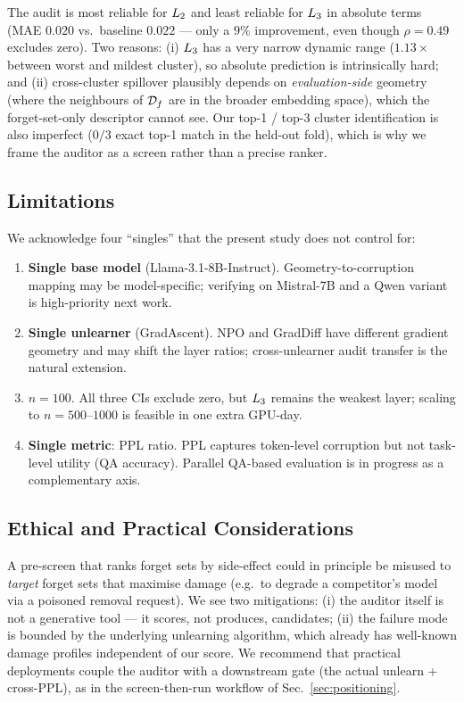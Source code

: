 The audit is most reliable for $L_2$ and least reliable for $L_3$ in absolute terms (MAE $0.020$ vs.\ baseline $0.022$ --- only a $9\%$ improvement, even though $\rho{=}0.49$ excludes zero). Two reasons: (i) $L_3$ has a very narrow dynamic range ($1.13\times$ between worst and mildest cluster), so absolute prediction is intrinsically hard; and (ii) cross-cluster spillover plausibly depends on \emph{evaluation-side} geometry (where the neighbours of $\mathcal{D}_f$ are in the broader embedding space), which the forget-set-only descriptor cannot see. Our top-1 / top-3 cluster identification is also imperfect ($0/3$ exact top-1 match in the held-out fold), which is why we frame the auditor as a screen rather than a precise ranker.

\subsection{Limitations}
\label{sec:limitations}

We acknowledge four ``singles'' that the present study does not control for:
\begin{enumerate}
    \setlength\itemsep{0.15em}
    \item \textbf{Single base model} (Llama-3.1-8B-Instruct). Geometry-to-corruption mapping may be model-specific; verifying on Mistral-7B and a Qwen variant is high-priority next work.
    \item \textbf{Single unlearner} (GradAscent). NPO and GradDiff have different gradient geometry and may shift the layer ratios; cross-unlearner audit transfer is the natural extension.
    \item \textbf{$n{=}100$}. All three CIs exclude zero, but $L_3$ remains the weakest layer; scaling to $n{=}500$--$1000$ is feasible in one extra GPU-day.
    \item \textbf{Single metric}: PPL ratio. PPL captures token-level corruption but not task-level utility (QA accuracy). Parallel QA-based evaluation is in progress as a complementary axis.
\end{enumerate}

\subsection{Ethical and Practical Considerations}
\label{sec:ethics}

A pre-screen that ranks forget sets by side-effect could in principle be misused to \emph{target} forget sets that maximise damage (e.g.\ to degrade a competitor's model via a poisoned removal request). We see two mitigations: (i) the auditor itself is not a generative tool --- it scores, not produces, candidates; (ii) the failure mode is bounded by the underlying unlearning algorithm, which already has well-known damage profiles independent of our score. We recommend that practical deployments couple the auditor with a downstream gate (the actual unlearn + cross-PPL), as in the screen-then-run workflow of Sec.~\ref{sec:positioning}.
